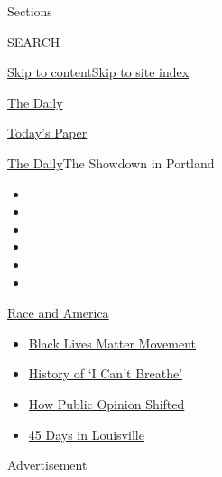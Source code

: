 Sections

SEARCH

\protect\hyperlink{site-content}{Skip to
content}\protect\hyperlink{site-index}{Skip to site index}

\href{https://www.nytimes.com/podcasts/the-daily}{The Daily}

\href{https://myaccount.nytimes.com/auth/login?response_type=cookie\&client_id=vi}{}

\href{https://www.nytimes.com/section/todayspaper}{Today's Paper}

\href{/podcasts/the-daily}{The Daily}\textbar{}The Showdown in Portland

\begin{itemize}
\item
\item
\item
\item
\item
\item
\end{itemize}

\href{https://www.nytimes.com/news-event/george-floyd-protests-minneapolis-new-york-los-angeles?action=click\&pgtype=Article\&state=default\&region=TOP_BANNER\&context=storylines_menu}{Race
and America}

\begin{itemize}
\tightlist
\item
  \href{https://www.nytimes.com/interactive/2020/07/03/us/george-floyd-protests-crowd-size.html?action=click\&pgtype=Article\&state=default\&region=TOP_BANNER\&context=storylines_menu}{Black
  Lives Matter Movement}
\item
  \href{https://www.nytimes.com/interactive/2020/06/28/us/i-cant-breathe-police-arrest.html?action=click\&pgtype=Article\&state=default\&region=TOP_BANNER\&context=storylines_menu}{History
  of `I Can't Breathe'}
\item
  \href{https://www.nytimes.com/interactive/2020/06/10/upshot/black-lives-matter-attitudes.html?action=click\&pgtype=Article\&state=default\&region=TOP_BANNER\&context=storylines_menu}{How
  Public Opinion Shifted}
\item
  \href{https://www.nytimes.com/interactive/2020/07/16/us/black-lives-matter-protests-louisville-breonna-taylor.html?action=click\&pgtype=Article\&state=default\&region=TOP_BANNER\&context=storylines_menu}{45
  Days in Louisville}
\end{itemize}

Advertisement


